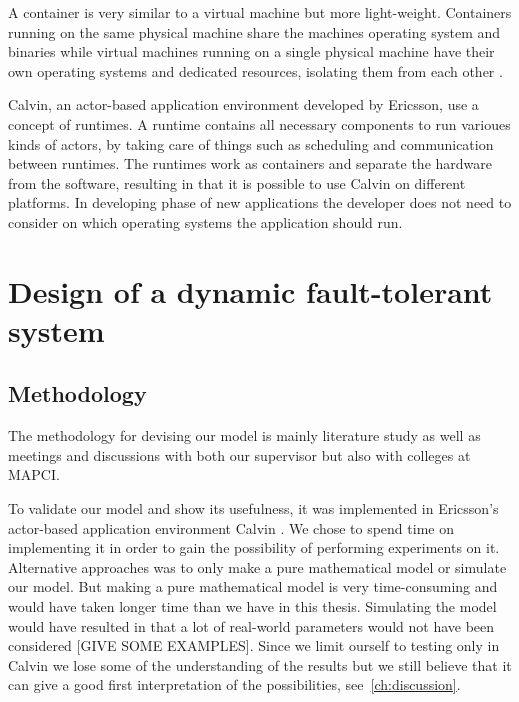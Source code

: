 \documentclass{cslthse-msc}
\begin{document}
A container is very similar to a virtual machine but more light-weight. Containers running on the same physical machine share the machines operating system and binaries while virtual machines running on a single physical machine have their own operating systems and dedicated resources, isolating them from each other \cite{vm_vs_container}.

Calvin, an actor-based application environment developed by Ericsson, use a concept of runtimes. A runtime contains all necessary components to run varioues kinds of actors, by taking care of things such as scheduling and communication between runtimes. The runtimes work as containers and separate the hardware from the software, resulting in that it is possible to use Calvin on different platforms. In developing phase of new applications the developer does not need to consider on which operating systems the application should run.

\chapter{Design of a dynamic fault-tolerant system} \label{ch:design}
\section{Methodology} \label{sec:design_methodology}
The methodology for devising our model is mainly literature study as well as meetings and discussions with both our supervisor but also with colleges at MAPCI.

To validate our model and show its usefulness, it was implemented in Ericsson's actor-based application environment Calvin \cite{calvin}. We chose to spend time on implementing it in order to gain the possibility of performing experiments on it. Alternative approaches was to only make a pure mathematical model or simulate our model. But making a pure mathematical model is very time-consuming and would have taken longer time than we have in this thesis. Simulating the model would have resulted in that a lot of real-world parameters would not have been considered [GIVE SOME EXAMPLES]. Since we limit ourself to testing only in Calvin we lose some of the understanding of the results but we still believe that it can give a good first interpretation of the possibilities, see~\autoref{ch:discussion}. 
\end{document}
